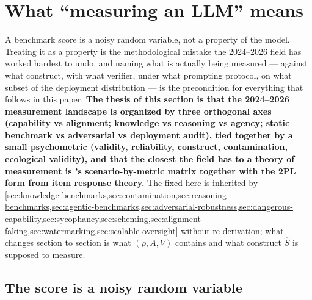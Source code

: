 
\section{What ``measuring an LLM'' means}
\label{sec:measuring-framing}
\label{sec:eval-methodology}

A benchmark score is a noisy random variable, not a property of the
model. Treating it as a property is the methodological mistake the
2024--2026 field has worked hardest to undo, and naming what is
actually being measured --- against what construct, with what
verifier, under what prompting protocol, on what subset of the
deployment distribution --- is the precondition for everything that
follows in this paper. \textbf{The thesis of this section is that the
2024--2026 measurement landscape is organized by three orthogonal
axes (capability vs alignment; knowledge vs reasoning vs agency;
static benchmark vs adversarial  vs deployment audit), tied
together by a small psychometric  (validity, reliability,
construct, contamination, ecological validity), and that the closest
the field has to a theory of measurement is 's
scenario-by-metric matrix \citep{liang2022-helm} together with the
2PL form from item response theory.} The  fixed here is
inherited by \cref{sec:knowledge-benchmarks,sec:contamination,sec:reasoning-benchmarks,sec:agentic-benchmarks,sec:adversarial-robustness,sec:dangerous-capability,sec:sycophancy,sec:scheming,sec:alignment-faking,sec:watermarking,sec:scalable-oversight}
without re-derivation; what changes section to section is what
$(\rho, A, V)$ contains and what construct $\hat{S}$ is supposed to
measure.

\subsection{The score is a noisy random variable}
\label{sec:measuring-score-rv}

